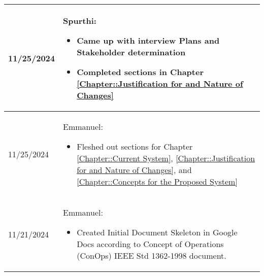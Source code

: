 \begin{longtable}{|l||p{13.5cm}|}
11/25/2024 & Spurthi:
\begin{itemize}[topsep=0pt,itemsep=0pt,parsep=0pt,partopsep=0pt,leftmargin=12pt]
    \item Came up with interview Plans and Stakeholder determination 
    \item Completed sections in Chapter \ref{Chapter::Justification for and Nature of Changes}
\end{itemize} 
\\ \hline

11/25/2024 & Emmanuel:
\begin{itemize}[topsep=0pt,itemsep=0pt,parsep=0pt,partopsep=0pt,leftmargin=12pt]
    \item Fleshed out sections for Chapter  \ref{Chapter::Current System}, 
    \ref{Chapter::Justification for and Nature of Changes}, and 
    \ref{Chapter::Concepts for the Proposed System}
\end{itemize} 
\\ \hline

11/21/2024 & Emmanuel:
\begin{itemize}[topsep=0pt,itemsep=0pt,parsep=0pt,partopsep=0pt,leftmargin=12pt]
    \item Created Initial Document Skeleton in Google Docs according to Concept of Operations (ConOps) IEEE Std 1362-1998 document.
\end{itemize} 
\\ \hline

\end{longtable}




